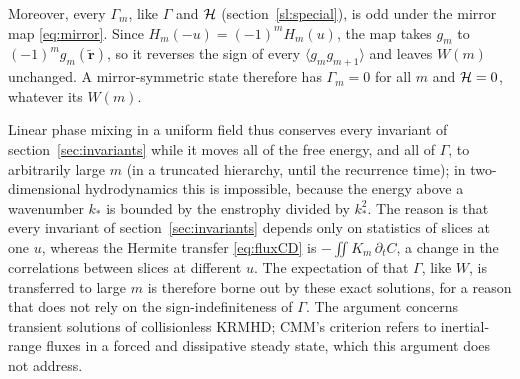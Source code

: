 Moreover, every $\Gamma_m$, like $\Gamma$ and $\mathcal H$ (section~\ref{sl:special}), is odd under the mirror map \eqref{eq:mirror}. Since $H_m(-u)=(-1)^mH_m(u)$, the map takes $g_m$ to $(-1)^mg_m(\tilde{\boldsymbol r})$, so it reverses the sign of every $\langle g_mg_{m+1}\rangle$ and leaves $W(m)$ unchanged. A mirror-symmetric state therefore has $\Gamma_m=0$ for all $m$ and $\mathcal H=0$, whatever its $W(m)$.

Linear phase mixing in a uniform field thus conserves every invariant of section~\ref{sec:invariants} while it moves all of the free energy, and all of $\Gamma$, to arbitrarily large $m$ (in a truncated hierarchy, until the recurrence time); in two-dimensional hydrodynamics this is impossible, because the energy above a wavenumber $k_*$ is bounded by the enstrophy divided by $k_*^2$. The reason is that every invariant of section~\ref{sec:invariants} depends only on statistics of slices at one $u$, whereas the Hermite transfer \eqref{eq:fluxCD} is $-\iint K_m\,\partial_tC$, a change in the correlations between slices at different $u$. The expectation of \citet{Chandran2026} that $\Gamma$, like $W$, is transferred to large $m$ is therefore borne out by these exact solutions, for a reason that does not rely on the sign-indefiniteness of $\Gamma$. The argument concerns transient solutions of collisionless KRMHD; CMM's criterion refers to inertial-range fluxes in a forced and dissipative steady state, which this argument does not address.
